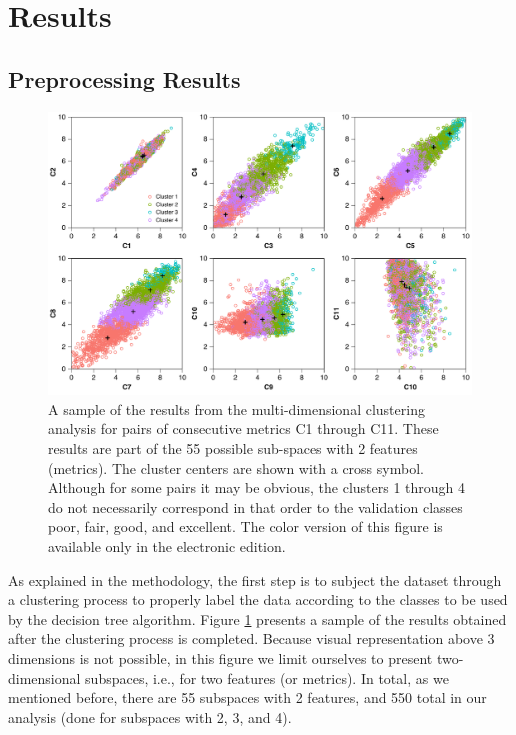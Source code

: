
\section{Results}
\label{sec:results}

\subsection{Preprocessing Results}

\begin{figure}[t]
	\centering
	\includegraphics[width=\textwidth]{figures/pdf/figure-05}
	\caption{A sample of the results from the multi-dimensional clustering analysis for pairs of consecutive metrics C1 through C11. These results are part of the 55 possible sub-spaces with 2 features (metrics). The cluster centers are shown with a cross symbol. Although for some pairs it may be obvious, the clusters 1 through 4 do not necessarily correspond in that order to the validation classes poor, fair, good, and excellent. The color version of this figure is available only in the electronic edition.}
	\label{fig:clusters}
\end{figure}

As explained in the methodology, the first step is to subject the dataset through a clustering process to properly label the data according to the classes to be used by the decision tree algorithm. Figure \ref{fig:clusters} presents a sample of the results obtained after the clustering process is completed. Because visual representation above 3 dimensions is not possible, in this figure we limit ourselves to present two-dimensional subspaces, i.e., for two features (or metrics). In total, as we mentioned before, there are 55 subspaces with 2 features, and 550 total in our analysis (done for subspaces with 2, 3, and 4). 

